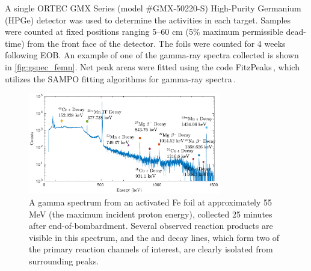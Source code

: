 A single 
ORTEC GMX Series (model \#GMX-50220-S)  High-Purity Germanium (HPGe) detector was used to determine the activities in each target.
Samples were counted at fixed positions ranging 5--60  cm (5\% maximum permissible dead-time) from the front face of the detector.
The foils were counted  for 
4 weeks following 
EOB.
An example of one of the gamma-ray spectra collected 
is shown in \autoref{fig:gspec_femn}.
Net peak areas were fitted using the 
code FitzPeaks\,\cite{fitzgerald2009fitzpeaks}, which utilizes the SAMPO fitting algorithms for gamma-ray spectra\,\cite{Aarnio2001}.

\begin{figure}
 \centering
 \includegraphics[width=0.75\textwidth]{./figures/sample_gspec_fe.pdf}
 \caption{A gamma spectrum  from an activated Fe foil at approximately 55\,MeV (the maximum incident proton energy), collected 25 minutes after end-of-bombardment. Several observed reaction products are visible in this spectrum, and  the  and  decay lines, which form two of the   primary reaction channels of interest, are  clearly isolated from surrounding peaks. }
 \label{fig:gspec_femn}
\end{figure}

